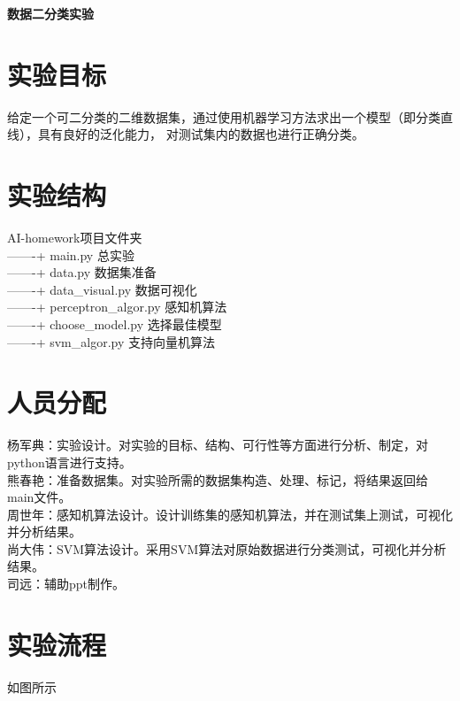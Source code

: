 \documentclass[UTF8,twoside,fontset=none,heading=true,scheme=chinese]{ctexart}
\newcommand{\erhao}{\fontsize{22pt}{33pt}\selectfont}
\newcommand{\wuhao}{\fontsize{10.5pt}{15.75pt}\selectfont}
\begin{document}
\wuhao

    \begin{center}
        \vspace{6pt}
        \erhao \textbf{
        数据二分类实验
        }
        \vspace{8pt}
    \end{center}

    \section{实验目标}
    \noindent 给定一个可二分类的二维数据集，通过使用机器学习方法求出一个模型（即分类直线），具有良好的泛化能力，
    对测试集内的数据也进行正确分类。

    \section{实验结构}
    \noindent AI-homework\quad 项目文件夹 \\    
    -------+ main.py  \qquad 总实验 \\
    -------+ data.py  \qquad 数据集准备 \\  
    -------+ data\_visual.py  \qquad 数据可视化 \\
    -------+ perceptron\_algor.py  \qquad 感知机算法 \\
    -------+ choose\_model.py  \qquad 选择最佳模型 \\
    -------+ svm\_algor.py  \qquad 支持向量机算法 \\

    \section{人员分配}
    \noindent 杨军典：实验设计。对实验的目标、结构、可行性等方面进行分析、制定，对python语言进行支持。\\
    熊春艳：准备数据集。对实验所需的数据集构造、处理、标记，将结果返回给main文件。\\
    周世年：感知机算法设计。设计训练集的感知机算法，并在测试集上测试，可视化并分析结果。\\
    尚大伟：SVM算法设计。采用SVM算法对原始数据进行分类测试，可视化并分析结果。 \\
    司远：辅助ppt制作。

    \section{实验流程}
    \noindent 如图所示
\end{document}
